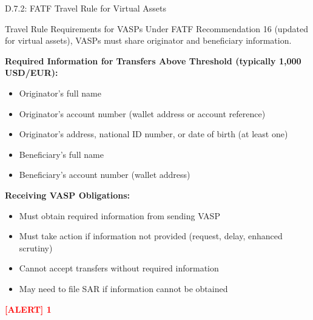 \documentclass[11pt,a4paper]{beamer}
\newcommand{\redflag}[1]{\textcolor{red}{\textbf{[ALERT] 1}}}
\begin{document}
\begin{frame}{D.7.2: FATF Travel Rule for Virtual Assets}
	\begin{block}{Travel Rule Requirements for VASPs}
		Under FATF Recommendation 16 (updated for virtual assets), VASPs must share originator and beneficiary information.
	\end{block}
	\textbf{Required Information for Transfers Above Threshold (typically 1,000 USD/EUR):}
	\begin{itemize}
		\item Originator's full name
		\item Originator's account number (wallet address or account reference)
		\item Originator's address, national ID number, or date of birth (at least one)
		\item Beneficiary's full name
		\item Beneficiary's account number (wallet address)
	\end{itemize}
	\textbf{Receiving VASP Obligations:}
	\begin{itemize}
		\item Must obtain required information from sending VASP
		\item Must take action if information not provided (request, delay, enhanced scrutiny)
		\item Cannot accept transfers without required information
		\item May need to file SAR if information cannot be obtained
	\end{itemize}
	\redflag{Receiving VASP cannot simply ignore missing originator data.}
\end{frame}
\end{document}
